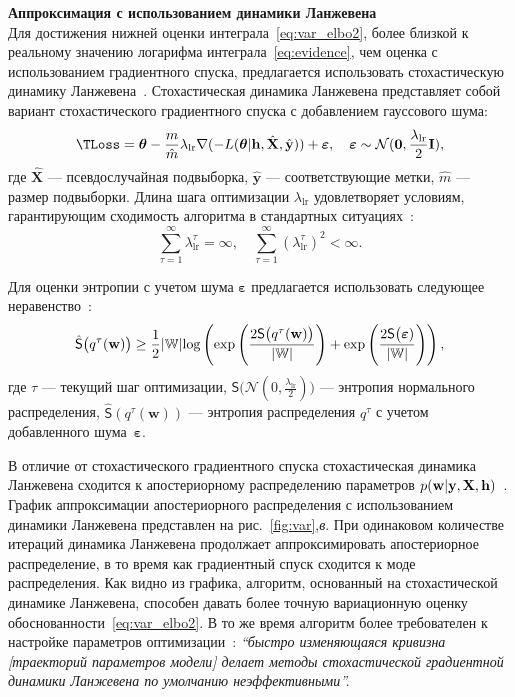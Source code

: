 \textbf{Аппроксимация с использованием динамики Ланжевена}\\
Для достижения нижней оценки интеграла~\eqref{eq:var_elbo2}, более близкой к реальному значению логарифма интеграла~\eqref{eq:evidence}, чем оценка с использованием градиентного спуска, предлагается использовать стохастическую динамику Ланжевена~\cite{langevin}. Стохастическая динамика Ланжевена представляет собой вариант стохастического градиентного спуска с добавлением гауссового шума:
\begin{equation}
\label{eq:langevin}
	\TLoss  = \boldsymbol{\theta} -\frac{m}{\hat{m}}  \lambda_{\text{lr}} \nabla (-L(\boldsymbol{\theta}| \mathbf{h}, \hat{\mathbf{X}}, \hat{\mathbf{y}}))  + \boldsymbol{\varepsilon}, \quad  \boldsymbol{\varepsilon} \sim \mathcal{N}(\mathbf{0}, {\frac{\lambda_{\text{lr}}}{2}}\mathbf{I}),
\end{equation}
где $\hat{\mathbf{X}}$ --- псевдослучайная подвыборка, $\hat{\mathbf{y}}$ --- соответствующие метки, $\hat{m}$ --- размер подвыборки. Длина шага оптимизации $\lambda_{\text{lr}}$ удовлетворяет  {условиям, гарантирующим сходимость алгоритма в стандартных ситуациях~\cite{langevin}}:
\[
	\sum_{\tau=1}^\infty \lambda_{\text{lr}}^\tau = \infty, \quad \sum_{\tau=1}^\infty (\lambda_{\text{lr}}^\tau)^2 < \infty.
\]

Для оценки энтропии с учетом шума $\boldsymbol{\varepsilon}$ предлагается использовать следующее неравенство~\cite{entropy,var_grad}:
\[
\hat{\mathsf{S}}\bigl(q^\tau(\mathbf{w})\bigr)   \geq \frac{1}{2}|\mathbb{W}|\textnormal{log}\left(\textnormal{exp}\left(\frac{2\mathsf{S}\bigl(q^\tau(\mathbf{w})\bigr)}{|\mathbb{W}|}\right) + \textnormal{exp}\left(\frac{2\mathsf{S}\bigl( \boldsymbol{\varepsilon})}{|\mathbb{W}|}\right)\right),
\]
{где  $\tau$ --- текущий шаг оптимизации,} $\mathsf{S}\bigl( \mathcal{N}({0}, {\frac{\lambda_{\text{lr}}}{2}})\bigr)$ --- энтропия нормального распределения, $\hat{\mathsf{S}}(q^\tau(\mathbf{w}))$ --- энтропия распределения $q^\tau$ с учетом добавленного шума~$\boldsymbol{\varepsilon}$.


В отличие от стохастического градиентного спуска стохастическая динамика Ланжевена сходится к апостериорному распределению параметров $p(\mathbf{w}|\mathbf{y}, \mathbf{X},\mathbf{h})$~\cite{langevin, langevin_sato}.  График аппроксимации апостериорного распределения с использованием динамики Ланжевена представлен на рис.~\ref{fig:var},\textit{в}. При одинаковом количестве итераций динамика Ланжевена продолжает аппроксимировать апостериорное распределение, в то время как градиентный спуск сходится к моде распределения. {Как видно из графика, алгоритм, основанный на стохастической динамике Ланжевена, способен давать более точную вариационную оценку обоснованности~\eqref{eq:var_elbo2}. В то же время алгоритм более требователен к настройке параметров оптимизации~\cite{sgld}: \textit{``быстро изменяющаяся кривизна [траекторий параметров модели] делает методы стохастической градиентной динамики Ланжевена по умолчанию неэффективными''.}}




